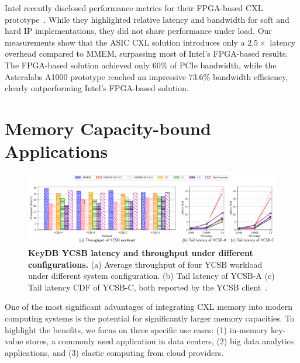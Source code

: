 Intel recently disclosed performance metrics for their FPGA-based CXL prototype~\cite{demystify}. While they highlighted relative latency and bandwidth for soft and hard IP implementations, they did not share performance under load. Our measurements show that the ASIC CXL solution introduces only a $2.5\times$ latency overhead compared to MMEM, surpassing most of Intel's FPGA-based results. The FPGA-based solution achieved only $60\%$ of PCIe bandwidth, while the Asteralabs A1000 prototype reached an impressive $73.6\%$ bandwidth efficiency, clearly outperforming Intel's FPGA-based solution.



\section{Memory Capacity-bound Applications}
\label{sec:capacity}


\begin{figure}[t]
\centering
  \includegraphics[width=1\textwidth]{fig/cxl/redis_ycsb_cxl.pdf}
  \caption[KeyDB YCSB latency and throughput under different configurations]{\textbf{KeyDB YCSB latency and throughput under different configurations.} (a) Average throughput of four YCSB workload under different system configuration. (b) Tail latency of YCSB-A (c) Tail latency CDF of YCSB-C, both reported by the YCSB client~\cite{YCSB}.}
  \label{fig:ycsb_cxl}
\end{figure}

One of the most significant advantages of integrating CXL memory into modern computing systems is the potential for significantly larger memory capacities. To highlight the benefits, we focus on three specific use cases: (1) in-memory key-value stores, a commonly used application in data centers, (2) big data analytics applications, and (3) elastic computing from cloud providers.

